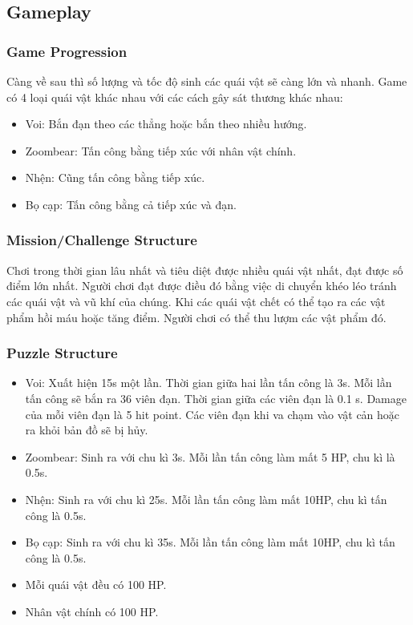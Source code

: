 \documentclass[../report.tex]{subfiles}
\begin{document}
\subsection{Gameplay}
\subsubsection{Game Progression}
Càng về sau thì số lượng và tốc độ sinh các quái
vật sẽ càng lớn và nhanh. Game có 4 loại quái vật khác
nhau với các cách gây sát thương khác nhau:
\begin{itemize}
\item Voi: Bắn đạn theo các thẳng hoặc bắn theo nhiều hướng. 
\item Zoombear: Tấn công bằng tiếp xúc với nhân vật chính. 
\item Nhện: Cũng tấn công bằng tiếp xúc.
\item Bọ cạp: Tấn công bằng cả tiếp xúc và đạn. 
\end{itemize}

\subsubsection{Mission/Challenge Structure}
Chơi trong thời gian lâu nhất và tiêu diệt được
nhiều quái vật nhất, đạt được số điểm lớn nhất.
Người chơi đạt được điều đó bằng việc di chuyển
khéo léo tránh các quái vật và vũ khí của chúng.
Khi các quái vật chết có thể tạo ra các vật phẩm
hồi máu hoặc tăng điểm. Người chơi có thể
thu lượm các vật phẩm đó. 

\subsubsection{Puzzle Structure}
\begin{itemize}
\item Voi: Xuất hiện 15s một lần. Thời gian giữa hai lần
    tấn công là 3s. Mỗi lần tấn công sẽ bắn ra 36 viên đạn.
    Thời gian giữa các viên đạn là 0.1 s. Damage của mỗi
    viên đạn là 5 hit point. Các viên đạn khi va chạm
    vào vật cản hoặc ra khỏi bản đồ sẽ bị hủy.
\item Zoombear: Sinh ra với chu kì 3s. Mỗi lần
    tấn công làm mất 5 HP, chu kì là 0.5s. 
\item Nhện: Sinh ra với chu kì 25s. Mỗi lần tấn công
    làm mất 10HP, chu kì tấn công là 0.5s. 
\item Bọ cạp: Sinh ra với chu kì 35s. Mỗi lần tấn
    công làm mất 10HP, chu kì tấn công là 0.5s.
\item Mỗi quái vật đều có 100 HP. 
\item Nhân vật chính có 100 HP. 
\end{itemize}
\end{document}

